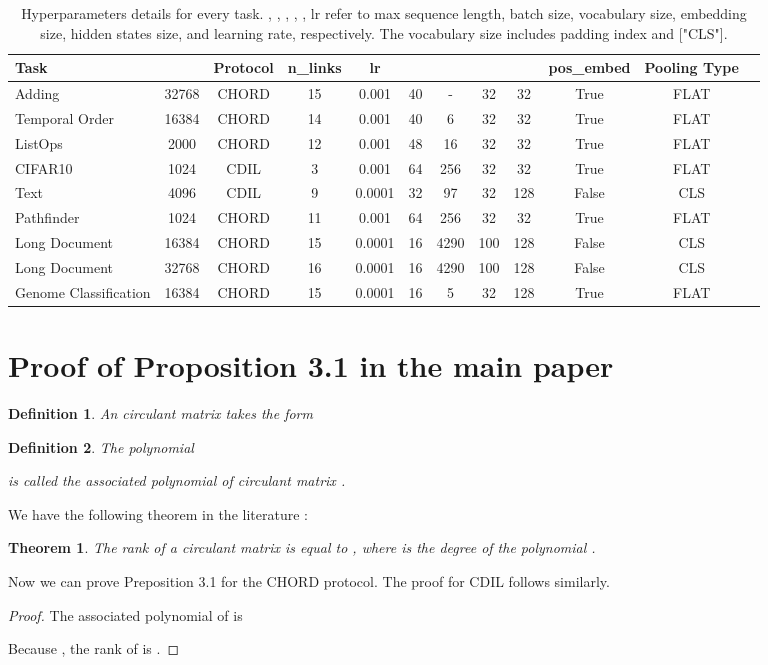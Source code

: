 \documentclass{article}
\newtheorem{theorem}{Theorem}
\newtheorem{definition}{Definition}
\begin{document}
\begin{table*}[t]
\centering
\caption{Hyperparameters details for every task. , , , , , lr refer to max sequence length, batch size, vocabulary size, embedding size, hidden states size, and learning rate, respectively. The vocabulary size includes padding index and ["CLS"].}
\label{tab:configs}
\begin{tabular}{lccccccccccc}
\hline\hline
Task     &  & Protocol & n\_links & lr &  &  &  &  & pos\_embed & Pooling Type \\
\hline
Adding         & 32768 & CHORD & 15 & 0.001 & 40 & - & 32 & 32 & True & FLAT\\
Temporal Order & 16384 & CHORD & 14 & 0.001 & 40 & 6 & 32 & 32 & True & FLAT\\
\hline
ListOps & 2000 & CHORD & 12 & 0.001 & 48 & 16 & 32 & 32 & True & FLAT\\
CIFAR10 & 1024 & CDIL & 3 & 0.001 & 64 & 256 & 32 & 32 & True & FLAT\\ 
Text & 4096 & CDIL & 9 & 0.0001 & 32 & 97 & 32 & 128 & False & CLS\\
Pathfinder & 1024 & CHORD & 11 & 0.001 & 64 & 256 & 32 & 32 & True & FLAT\\ 
\hline
Long Document & 16384 & CHORD & 15 & 0.0001 & 16 & 4290 & 100 & 128 & False & CLS\\
Long Document & 32768 & CHORD & 16 & 0.0001 & 16 & 4290 & 100 & 128 & False & CLS\\
\hline
Genome Classification & 16384 & CHORD & 15 & 0.0001 & 16 & 5 & 32 & 128 & True & FLAT\\
\hline
\hline
\end{tabular}
\end{table*}

\section{Proof of Proposition 3.1 in the main paper}
\begin{definition}
An  circulant matrix  takes the form

\end{definition}

\begin{definition}
The polynomial 

is called the associated polynomial of circulant matrix .
\end{definition}

We have the following theorem in the literature \cite{circulantrank}:
\begin{theorem}
The rank of a circulant matrix  is equal to , where  is the degree of the polynomial .
\end{theorem}

Now we can prove Preposition 3.1 for the CHORD protocol. The proof for CDIL follows similarly.
\begin{proof}
The associated polynomial of  is

Because , the rank of  is .
\end{proof}
\end{document}
